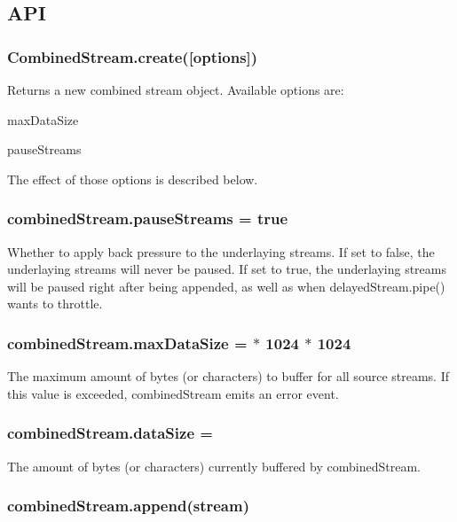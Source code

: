 \subsection*{A\+P\+I}

\subsubsection*{Combined\+Stream.\+create(\mbox{[}options\mbox{]})}

Returns a new combined stream object. Available options are\+:


\begin{DoxyItemize}
\item {\ttfamily max\+Data\+Size}
\item {\ttfamily pause\+Streams}
\end{DoxyItemize}

The effect of those options is described below.

\subsubsection*{combined\+Stream.\+pause\+Streams = {\ttfamily true}}

Whether to apply back pressure to the underlaying streams. If set to {\ttfamily false}, the underlaying streams will never be paused. If set to {\ttfamily true}, the underlaying streams will be paused right after being appended, as well as when {\ttfamily delayed\+Stream.\+pipe()} wants to throttle.

\subsubsection*{combined\+Stream.\+max\+Data\+Size = { $\ast$ 1024 $\ast$ 1024}}

The maximum amount of bytes (or characters) to buffer for all source streams. If this value is exceeded, {\ttfamily combined\+Stream} emits an {\ttfamily \textquotesingle{}error\textquotesingle{}} event.

\subsubsection*{combined\+Stream.\+data\+Size = {}}

The amount of bytes (or characters) currently buffered by {\ttfamily combined\+Stream}.

\subsubsection*{combined\+Stream.\+append(stream)}

